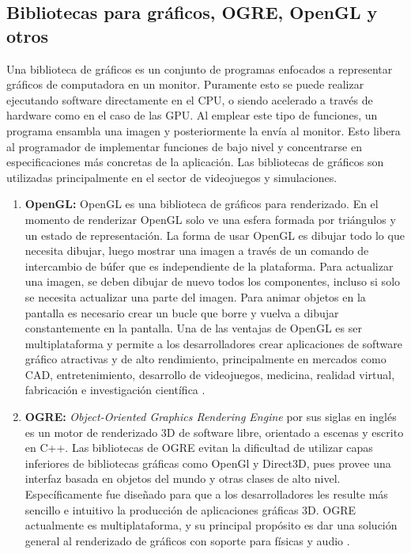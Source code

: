 \subsection{Bibliotecas para gráficos, OGRE, OpenGL y otros} \label{sub:bibliotecas_para_gráficos_OGRE_OpenGL_y_otros}

Una biblioteca de gráficos es un conjunto de programas enfocados a representar gráficos de computadora en un monitor. Puramente esto se puede realizar ejecutando software directamente en el CPU, o siendo acelerado a través de hardware como en el caso de las GPU. Al emplear este tipo de funciones, un programa ensambla una imagen y posteriormente la envía al monitor. Esto libera al programador de implementar funciones de bajo nivel y concentrarse en especificaciones más concretas de la aplicación. Las bibliotecas de gráficos son utilizadas principalmente en el sector de videojuegos y simulaciones.

\begin{enumerate}
    \item \textbf{OpenGL:} OpenGL es una biblioteca de gráficos para renderizado. En el momento de renderizar OpenGL solo ve una esfera formada por triángulos y un estado de representación. La forma de usar OpenGL es dibujar todo lo que necesita dibujar, luego mostrar una imagen a través de un comando de intercambio de búfer que es independiente de la plataforma. Para actualizar una imagen, se deben dibujar de nuevo todos los componentes, incluso si solo se necesita actualizar una parte del imagen. Para animar objetos en la pantalla es necesario crear un bucle que borre y vuelva a dibujar constantemente en la pantalla.
    Una de las ventajas de OpenGL es ser multiplataforma y permite a los desarrolladores crear aplicaciones de software gráfico atractivas y de alto rendimiento, principalmente en mercados como CAD, entretenimiento, desarrollo de videojuegos, medicina, realidad virtual, fabricación e investigación científica \cite{opengl}.
    
    \item \textbf{OGRE:} \textit{Object-Oriented Graphics Rendering Engine} por sus siglas en inglés es un motor de renderizado 3D de software libre, orientado a escenas y escrito en C++.  Las bibliotecas de OGRE evitan la dificultad de utilizar capas inferiores de bibliotecas gráficas como OpenGl y Direct3D, pues provee una interfaz basada en objetos del mundo y otras clases de alto nivel. Específicamente fue diseñado para que a los desarrolladores les resulte más sencillo e intuitivo la producción de aplicaciones gráficas 3D. OGRE actualmente es multiplataforma, y su principal propósito es dar una solución general al renderizado de gráficos con soporte para físicas y audio \cite{ogre}.
\end{enumerate}

